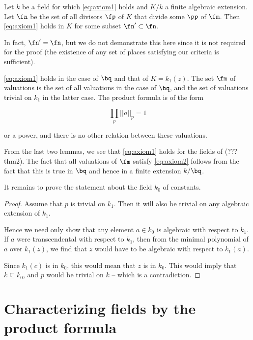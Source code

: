 \begin{lemma}
  Let $k$ be a field for which \ref{eq:axiom1} holds and $K/k$ a finite algebraic
  extension. Let $\fn$ be the set of all divisors $\fp$ of $K$ that divide some
  $\pp$ of $\fm$. Then \ref{eq:axiom1} holds in $K$ for some subset $\fn' \subset \fn$.
\end{lemma}

In fact, $\fn' = \fn$, but we do not demonstrate this here since it is not
required for the proof (the existence of any set of places satisfying our
criteria is sufficient).

\begin{lemma}
  \ref{eq:axiom1} holds in the case of $\bq$ and that of $K=k_1(z)$. The set $\fm$
  of valuations is the set of all valuations in the case of $\bq$, and the set of
  valuations trivial on $k_1$ in the latter case. The product formula is of the
  form

  \[ \prod_p {||a||}_p = 1 \]

  or a power, and there is no other relation between these valuations.

\end{lemma}

From the last two lemmas, we see that \ref{eq:axiom1} holds for the fields of
(??? thm2). The fact that all valuations of $\fm$ satisfy \ref{eq:axiom2}
follows from the fact that this is true in $\bq$ and hence in a finite extension
$k/\bq$.

It remains to prove the statement about the field $k_0$ of constants.

\begin{proof}
  Assume that $p$ is trivial on $k_1$. Then it will also be trivial on any
  algebraic extension of $k_1$.

  Hence we need only show that any element $a \in k_0$ is algebraic with respect
  to $k_1$. If $a$ were transcendental with respect to $k_1$, then from the
  minimal polynomial of $a$ over $k_1(z)$, we find that $z$ would have to be
  algebraic with respect to $k_1(a)$.

  Since $k_1(c)$ is in $k_0$, this would mean that $z$ is in $k_0$. This would
  imply that $k\subseteq k_0$, and $p$ would be trivial on $k$ -- which is a
  contradiction.
\end{proof}

\section{Characterizing fields by the product formula}
\label{sec:orgheadline28}


